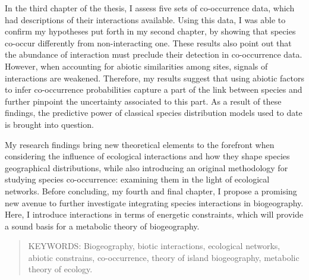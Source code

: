In the third chapter of the thesis, I assess five sets of co-occurrence
data, which had descriptions of their interactions available. Using this
data, I was able to confirm my hypotheses put forth in my second
chapter, by showing that species co-occur differently from
non-interacting one. These results also point out that the abundance of
interaction must preclude their detection in co-occurrence data.
However, when accounting for abiotic similarities among sites, signals
of interactions are weakened. Therefore, my results suggest that using
abiotic factors to infer co-occurrence probabilities capture a part of
the link between species and further pinpoint the uncertainty associated
to this part. As a result of these findings, the predictive power of
classical species distribution models used to date is brought into
question.

My research findings bring new theoretical elements to the forefront
when considering the influence of ecological interactions and how they
shape species geographical distributions, while also introducing an
original methodology for studying species co-occurrence: examining them
in the light of ecological networks. Before concluding, my fourth and
final chapter, I propose a promising new avenue to further investigate
integrating species interactions in biogeography. Here, I introduce
interactions in terms of energetic constraints, which will provide a
sound basis for a metabolic theory of biogeography.

\begin{quote}
KEYWORDS: Biogeography, biotic interactions, ecological networks,
abiotic constrains, co-occurrence, theory of island biogeography,
metabolic theory of ecology.
\end{quote}
